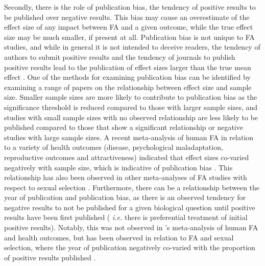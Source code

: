 Secondly, there is the role of publication bias, the tendency of positive results to be published over negative results. This bias may cause an overestimate of the effect size of any impact between FA and a given outcome, while the true effect size may be much smaller, if present at all. Publication bias is not unique to FA studies, and while in general it is not intended to deceive readers, the tendency of authors to submit positive results and the tendency of journals to publish positive results lead to the publication of effect sizes larger than the true mean effect \citep{Levine.2009}. One of the methods for examining publication bias can be identified by examining a range of papers on the relationship between effect size and sample size. Smaller sample sizes are more likely to contribute to publication bias as the significance threshold is reduced compared to those with larger sample sizes, and studies with small sample sizes with no observed relationship are less likely to be published compared to those that show a significant relationship or negative studies with large sample sizes. A recent meta-analysis of human FA in relation to a variety of health outcomes (disease, psychological maladaptation, reproductive outcomes and attractiveness) indicated that effect sizes co-varied negatively with sample size, which is indicative of publication bias \citep{Dongen.2011}. This relationship has also been observed in other meta-analyses of FA studies with respect to sexual selection \citep{Palmer.1999}.
Furthermore, there can be a relationship between the year of publication and publication bias, as there is an observed tendency for negative results to not be published for a given biological question until positive results have been first published ( \textit{i.e.} there is preferential treatment of initial positive results). Notably, this was not observed in \citet{Dongen.2011}'s meta-analysis of human FA and health outcomes, but has been observed in relation to FA and sexual selection, where the year of publication negatively co-varied with the proportion of positive results published \citep{Tomkins.2003}.

